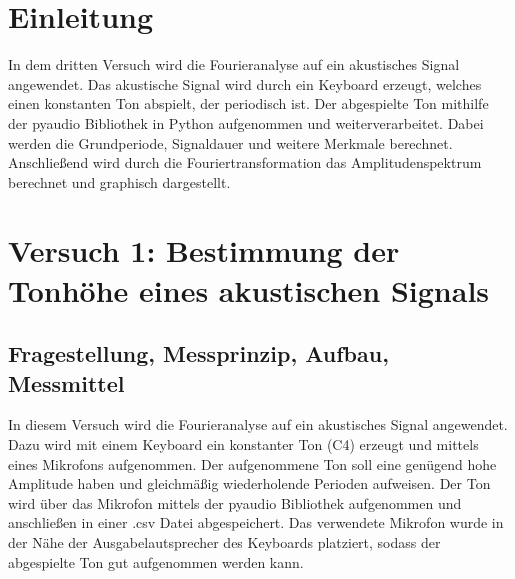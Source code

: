 \documentclass[12pt, oneside, a4paper, \docLanguage]{report}
\begin{document}

\setcounter{section}{0}



\clearpage

%
%


%
%


%
%


%
%




\setcounter{page}{1}
\pagestyle{default}
%
%
\chapter{Einleitung}
\label{chap:EINL}

In dem dritten Versuch wird die Fourieranalyse auf ein akustisches Signal angewendet. Das akustische Signal wird durch ein Keyboard erzeugt, welches einen konstanten Ton abspielt, der periodisch ist. Der abgespielte Ton mithilfe der pyaudio Bibliothek in Python aufgenommen und weiterverarbeitet. Dabei werden die Grundperiode, Signaldauer und weitere Merkmale berechnet. Anschließend wird durch die Fouriertransformation das Amplitudenspektrum berechnet und graphisch dargestellt.

%
%
\chapter{Versuch 1: Bestimmung der Tonhöhe eines akustischen Signals}
\label{chap:VERSUCH_1}

\section{Fragestellung, Messprinzip, Aufbau, Messmittel}
\label{chap:VERSUCH_1_FRAGESTELLUNG}

In diesem Versuch wird die Fourieranalyse auf ein akustisches Signal angewendet. Dazu wird mit einem Keyboard ein konstanter Ton (C4) erzeugt und mittels eines Mikrofons aufgenommen. Der aufgenommene Ton soll eine genügend hohe Amplitude haben und gleichmäßig wiederholende Perioden aufweisen. Der Ton wird über das Mikrofon mittels der pyaudio Bibliothek aufgenommen und anschließen in einer .csv Datei abgespeichert.
Das verwendete Mikrofon wurde in der Nähe der Ausgabelautsprecher des Keyboards platziert, sodass der abgespielte Ton gut aufgenommen werden kann.
\end{document}
